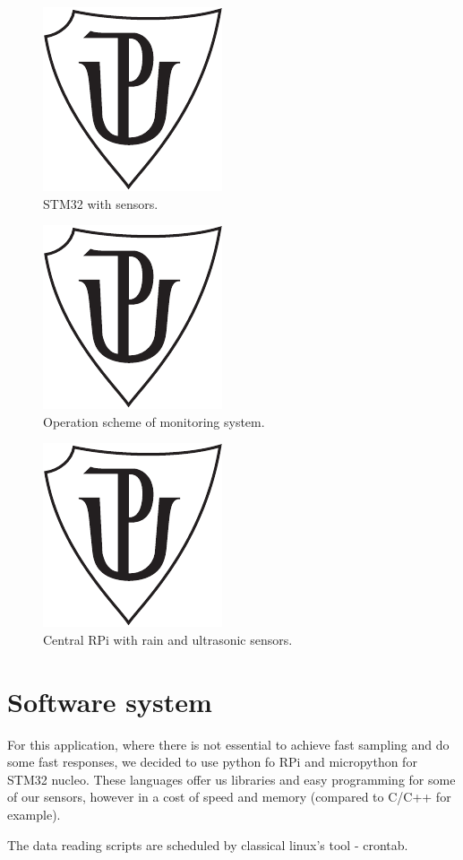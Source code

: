 \begin{figure}[H]
 \centering
 \includegraphics{up_logo_bw}
 \caption{STM32 with sensors.}
 \label{MonNuc}
\end{figure}


\begin{figure}[H]
 \centering
 \includegraphics{up_logo_bw}
 \caption{Operation scheme of monitoring system.}
 \label{opScheme}
\end{figure}

\begin{figure}[H]
 \centering
 \includegraphics{up_logo_bw}
 \caption{Central RPi with rain and ultrasonic sensors.}
 \label{MonRpi}
\end{figure}




\section{Software system}
For this application, where there is not essential to achieve fast sampling and do some fast responses, we decided to use python fo RPi and micropython for STM32 nucleo. These languages offer us libraries and easy programming for some of our sensors, however in a cost of speed and memory (compared to C/C++ for example).
\par
The data reading scripts are scheduled by classical linux's tool - crontab.


